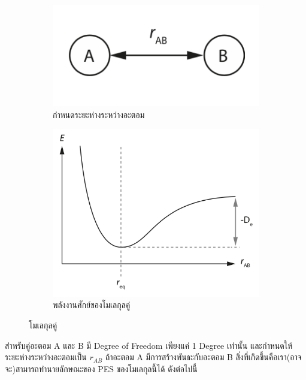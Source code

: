 \begin{figure}[H]
    \centering
    \begin{subfigure}{0.5\textwidth}
        \centering
        \includegraphics[width=0.9\linewidth]{fig/diatomic_molecule.png}
        \caption{กำหนดระยะห่างระหว่างอะตอม}
        \label{fig:diatomic_mol}
    \end{subfigure}%
    \begin{subfigure}{0.5\textwidth}
        \centering
        \includegraphics[width=0.9\linewidth]{fig/PES_diatomic_mol.png}
        \caption{พลังงานศักย์ของโมเลกุลคู่}
        \label{fig:PES_diatomic}
    \end{subfigure}
    \caption{โมเลกุลคู่}
    \label{fig:diatomic_mol_and_PES}
\end{figure}

สำหรับคู่อะตอม A และ B มี Degree of Freedom เพียงแค่ 1 Degree เท่านั้น และกำหนดให้ระยะห่างระหว่างอะตอมเป็น $r_{AB}$ ถ้าอะตอม 
A มีการสร้างพันธะกับอะตอม B สิ่งที่เกิดขึ้นคือเรา(อาจจะ)สามารถทำนายลักษณะของ PES ของโมเลกุลนี้ได้ ดังต่อไปนี้

